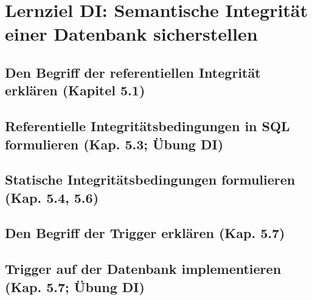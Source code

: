 \section{Lernziel DI: Semantische Integrität einer Datenbank sicherstellen}

\subsection{Den Begriff der referentiellen Integrität erklären (Kapitel 5.1)}

\subsection{Referentielle Integritätsbedingungen in SQL formulieren (Kap. 5.3; Übung DI)}

\subsection{Statische Integritätsbedingungen formulieren (Kap. 5.4, 5.6)}

\subsection{Den Begriff der Trigger erklären (Kap. 5.7)}

\subsection{Trigger auf der Datenbank implementieren (Kap. 5.7; Übung DI)}